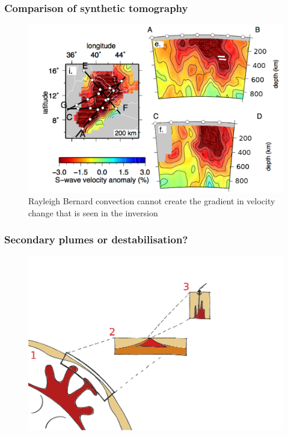 \documentclass[aspectratio=169]{beamer}
\begin{document}
\begin{frame}
    \frametitle{Comparison of synthetic tomography}
    \begin{figure}
        \includegraphics[height=0.7\paperheight]{./figures/chiara1.png}
        \caption{Rayleigh Bernard convection cannot create the gradient in velocity change that is seen in the inversion}
    \end{figure}
\end{frame}

\begin{frame}
    \frametitle{Secondary plumes or destabilisation?}
    \begin{figure}
        \includegraphics[height=0.9\paperheight]{./pictures/drawing.png}
    \end{figure}
\end{frame}
\end{document}

